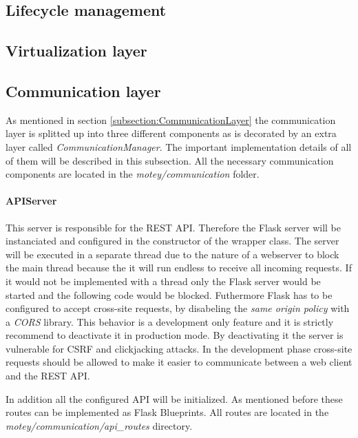 \subsection{Lifecycle management}
\doit

\subsection{Virtualization layer}
\doit

\subsection{Communication layer}
\label{subsection:implementation-communication-layer}
As mentioned in section \ref{subsection:CommunicationLayer} the communication layer is splitted up into three different components as is decorated by an extra layer called \textit{CommunicationManager}.
The important implementation details of all of them will be described in this subsection.
All the necessary communication components are located in the \textit{motey/communication} folder.

\paragraph{APIServer} This server is responsible for the \ac{REST} \ac{API}.
Therefore the Flask server will be instanciated and configured in the constructor of the wrapper class.
The server will be executed in a separate thread due to the nature of a webserver to block the main thread because the it will run endless to receive all incoming requests.
If it would not be implemented with a thread only the Flask server would be started and the following code would be blocked.
Futhermore Flask has to be configured to accept cross-site requests, by disabeling the \textit{same origin policy} with a \textit{\ac{CORS}} library.
This behavior is a development only feature and it is strictly recommend to deactivate it in production mode.
By deactivating it the server is vulnerable for \ac{CSRF} and clickjacking attacks.
In the development phase cross-site requests should be allowed to make it easier to communicate between a web client and the \ac{REST} \ac{API}.

In addition all the configured \ac{API} will be initialized.
As mentioned before these routes can be implemented as Flask Blueprints.
All routes are located in the \textit{motey/communication/api\_routes} directory.

